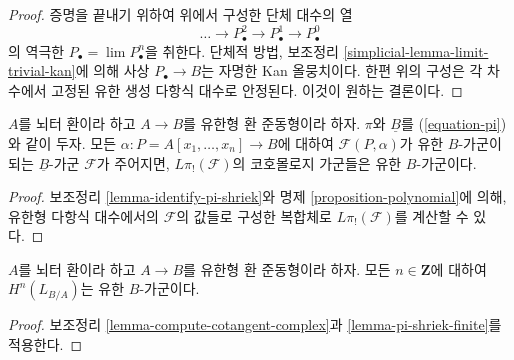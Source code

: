 \begin{proof}
\medskip\noindent
증명을 끝내기 위하여 위에서 구성한 단체 대수의 열
$$
\ldots \to P^2_\bullet \to P^1_\bullet \to P^0_\bullet
$$
의 역극한 $P_\bullet=\lim P^n_\bullet$을 취한다. 단체적 방법, 보조정리
\ref{simplicial-lemma-limit-trivial-kan}에 의해 사상 $P_\bullet\to B$는
자명한 Kan 올뭉치이다. 한편 위의 구성은 각 차수에서 고정된 유한 생성
다항식 대수로 안정된다. 이것이 원하는 결론이다.
\end{proof}

\begin{lemma}
\label{lemma-pi-shriek-finite}
$A$를 뇌터 환이라 하고 $A\to B$를 유한형 환 준동형이라 하자. $\pi$와
$\underline{B}$를 (\ref{equation-pi})와 같이 두자. 모든
$\alpha:P=A[x_1,\ldots,x_n]\to B$에 대하여
$\mathcal{F}(P,\alpha)$가 유한 $B$-가군이 되는
$\underline{B}$-가군 $\mathcal{F}$가 주어지면,
$L\pi_!(\mathcal{F})$의 코호몰로지 가군들은 유한 $B$-가군이다.
\end{lemma}

\begin{proof}
보조정리 \ref{lemma-identify-pi-shriek}와 명제
\ref{proposition-polynomial}에 의해, 유한형 다항식 대수에서의
$\mathcal{F}$의 값들로 구성한 복합체로 $L\pi_!(\mathcal{F})$를 계산할 수
있다.
\end{proof}

\begin{lemma}
\label{lemma-cotangent-finite}
$A$를 뇌터 환이라 하고 $A\to B$를 유한형 환 준동형이라 하자. 모든
$n\in\mathbf{Z}$에 대하여 $H^n(L_{B/A})$는 유한 $B$-가군이다.
\end{lemma}

\begin{proof}
보조정리 \ref{lemma-compute-cotangent-complex}과
\ref{lemma-pi-shriek-finite}를 적용한다.
\end{proof}

